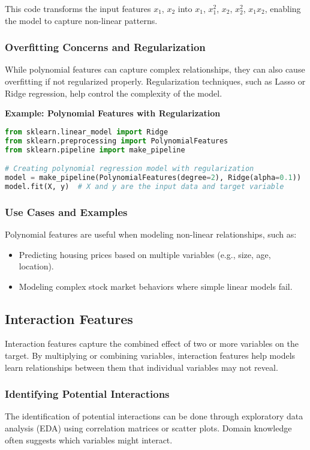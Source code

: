 \documentclass{article}
\begin{document}
This code transforms the input features $x_1$, $x_2$ into $x_1$, $x_1^2$, $x_2$, $x_2^2$, $x_1x_2$, enabling the model to capture non-linear patterns.

\subsubsection{Overfitting Concerns and Regularization}
While polynomial features can capture complex relationships, they can also cause overfitting if not regularized properly. Regularization techniques, such as Lasso or Ridge regression, help control the complexity of the model.

\textbf{Example: Polynomial Features with Regularization}

\begin{lstlisting}[language=Python]
from sklearn.linear_model import Ridge
from sklearn.preprocessing import PolynomialFeatures
from sklearn.pipeline import make_pipeline

# Creating polynomial regression model with regularization
model = make_pipeline(PolynomialFeatures(degree=2), Ridge(alpha=0.1))
model.fit(X, y)  # X and y are the input data and target variable
\end{lstlisting}

\subsubsection{Use Cases and Examples}
Polynomial features are useful when modeling non-linear relationships, such as:
\begin{itemize}
    \item Predicting housing prices based on multiple variables (e.g., size, age, location).
    \item Modeling complex stock market behaviors where simple linear models fail.
\end{itemize}

\subsection{Interaction Features}
Interaction features capture the combined effect of two or more variables on the target. By multiplying or combining variables, interaction features help models learn relationships between them that individual variables may not reveal.

\subsubsection{Identifying Potential Interactions}
The identification of potential interactions can be done through exploratory data analysis (EDA) using correlation matrices or scatter plots. Domain knowledge often suggests which variables might interact.
\end{document}
